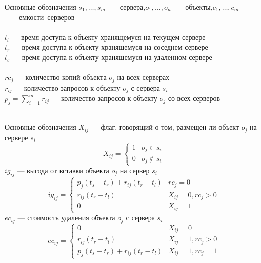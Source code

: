 \documentclass{beamer}
\begin{document}
\begin{frame}[fragile]{Основные обозначения}
	$s_1, \ldots, s_m$~---~сервера,\quad$o_1, \ldots, o_n$~---~объекты,\quad$c_1, \ldots, c_m$~---~емкости~серверов\\~\\
	
	$t_l$ --- время доступа к объекту хранящемуся на текущем сервере\\
	$t_r$ --- время доступа к объекту хранящемуся на соседнем сервере\\
	$t_s$ --- время доступа к объекту хранящемуся на удаленном сервере\\~\\

	$rc_j$ --- количество копий объекта $o_j$ на всех серверах\\
	$r_{ij}$ --- количество запросов к объекту $o_j$ с сервера $s_i$\\
	$p_j = \sum_{i=1}^{m} r_{ij}$ --- количество запросов к объекту $o_j$ со всех серверов\\~\\
\end{frame}

\begin{frame}[fragile]{Основные обозначения}
	$X_{ij}$ --- флаг, говорящий о том, размещен ли объект $o_j$ на сервере $s_i$
	\[ 	
		X_{ij} =
		\begin{cases} 
			1 & o_j \in s_i \\ 
			0 & o_j \notin s_i 
		\end{cases}
	\] 
	$ig_{ij}$ --- выгода от вставки объекта $o_j$ на сервер $s_i$
	\[ 	
		ig_{ij} =
		\begin{cases} 
			p_j (t_s - t_r) + r_{ij} (t_r - t_l) 	& rc_j = 0 \\
			r_{ij} (t_r - t_l) 						& X_{ij} = 0, rc_j > 0 \\
			0 										& X_{ij} = 1 
		\end{cases}
	\] 
	$ec_{ij}$ --- стоимость удаления объекта $o_j$ с сервера $s_i$
	\[ 	
		ec_{ij} =
		\begin{cases} 
			0										& X_{ij} = 0 \\
			r_{ij} (t_r - t_l) 						& X_{ij} = 1, rc_j > 0 \\
			p_j (t_s - t_r) + r_{ij} (t_r - t_l)	& X_{ij} = 1, rc_j = 1 
		\end{cases}
	\]
\end{frame}
\end{document}
